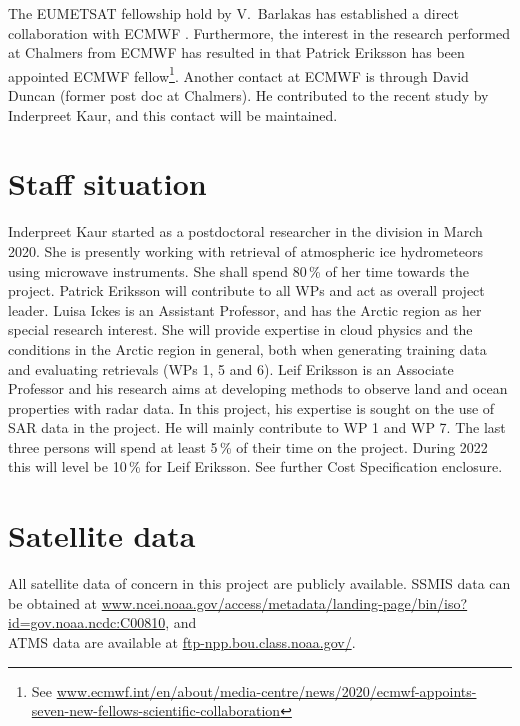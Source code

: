 \documentclass[12pt,oneside,a4paper]{article}
\begin{document}
The EUMETSAT fellowship hold by V.\ Barlakas has established a direct
collaboration with ECMWF \citep{barlakas:intro:21}. Furthermore, the interest
in the research performed at Chalmers from ECMWF has resulted in
that Patrick
Eriksson has been appointed ECMWF fellow\footnote{See 
  \url{www.ecmwf.int/en/about/media-centre/news/2020/ecmwf-appoints-seven-new-fellows-scientific-collaboration}}.
Another contact at ECMWF is through David Duncan (former post doc at Chalmers).
He contributed to the recent study by Inderpreet Kaur, and this contact will be
maintained.
\section{Staff situation}
%
\label{sec:staff}
Inderpreet Kaur started as a postdoctoral researcher in the division in March
2020. She is presently working with retrieval of atmospheric ice hydrometeors
using microwave instruments. She shall spend 80\,\% of her time towards the
project. Patrick Eriksson will contribute to all WPs and act as overall project
leader. Luisa Ickes is an Assistant Professor, and has the Arctic region as her
special research interest. She will provide expertise in cloud physics and the
conditions in the Arctic region in general, both when generating training data
and evaluating retrievals (WPs 1, 5 and 6). Leif Eriksson is an Associate
Professor and his research aims at developing methods to observe land and ocean
properties with radar data. In this project, his expertise is sought on the use
of SAR data in the project. He will mainly contribute to WP 1 and WP 7. The
last three persons will spend at least 5\,\% of their time on the project.
During 2022 this will level be 10\,\% for Leif Eriksson. See further Cost
Specification enclosure.



\section{Satellite data}
%
All satellite data of concern in this project are publicly available. SSMIS
data can be obtained at
\url{www.ncei.noaa.gov/access/metadata/landing-page/bin/iso?id=gov.noaa.ncdc:C00810},
and\\ATMS data are available at \url{ftp-npp.bou.class.noaa.gov/}.

{\footnotesize
	
}
\end{document}
